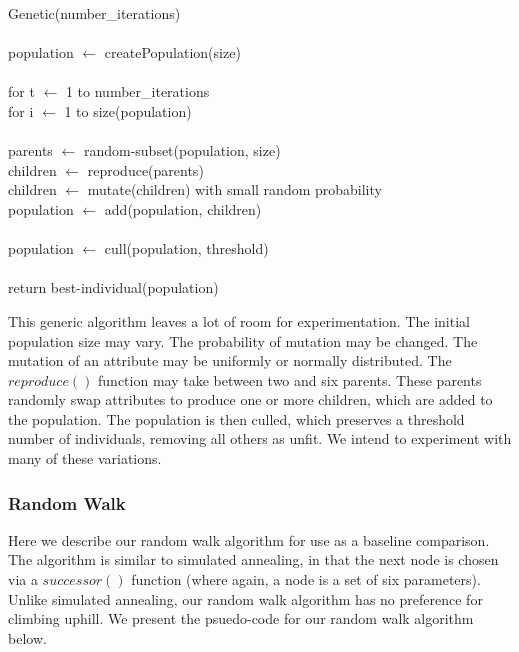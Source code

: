 \documentclass[10pt]{article}
\begin{document}
\setlength{\parindent}{5mm}
\indent Genetic(number\_iterations)\\\\
\indent\indent population $\leftarrow$ createPopulation(size)\\\\
\indent \indent for t $\leftarrow$ 1 to number\_iterations\\
\indent \indent \indent for i $\leftarrow$ 1 to size(population)\\\\
\indent \indent \indent \indent parents $\leftarrow$ random-subset(population, size)\\
\indent \indent \indent \indent children $\leftarrow$ reproduce(parents)\\
\indent \indent \indent \indent children $\leftarrow$ mutate(children) with small random probability\\
\indent \indent \indent \indent population $\leftarrow$ add(population, children)\\\\
\indent \indent \indent population $\leftarrow$ cull(population, threshold)\\\\
\indent \indent return best-individual(population)\\
\setlength{\parindent}{0mm}

This generic algorithm leaves a lot of room for experimentation. The initial
population size may vary.  The probability of mutation may be changed.  The
mutation of an attribute may be uniformly or normally distributed.  The
$reproduce()$ function may take between two and six parents.  These parents
randomly swap attributes to produce one or more children, which are added to
the population.  The population is then culled, which preserves a threshold
number of individuals, removing all others as unfit. We intend to experiment
with many of these variations.

\subsubsection{Random Walk}

Here we describe our random walk algorithm for use as a baseline comparison.
The algorithm is similar to simulated annealing, in that the next node is
chosen via a $successor()$ function (where again, a node is a set of six
parameters). Unlike simulated annealing, our random walk algorithm has no
preference for climbing uphill. We present the psuedo-code for our random walk
algorithm below.
\end{document}
